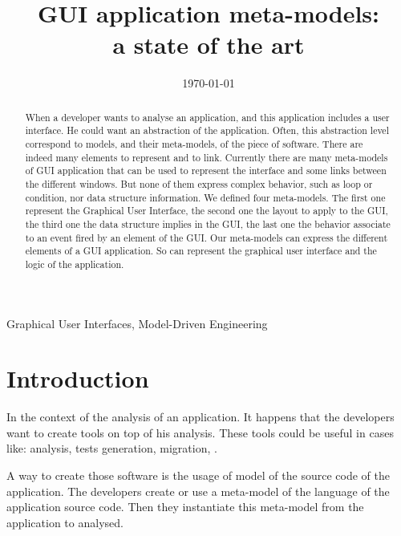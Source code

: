 \documentclass[conference]{IEEEtran}
\author{
    \IEEEauthorblockN{Beno\^{i}t Verhaeghe$^{1,2}$, Anne Etien$^1$,\\ Nicolas Anquetil$^1$, St\'{e}phane Ducasse$^1$}\IEEEauthorblockA{$^1$Universit\'{e} de Lille, CNRS, Inria, \\ Centrale Lille, UMR 9189 -- CRIStAL, France\\}
    \and
    \IEEEauthorblockN{Abderrahmane Seriai$^2$, Laurent Deruelle$^2$,\\ Mustapha Derras$^2$}\IEEEauthorblockA{$^2$Berger-Levrault, France}     
}
\begin{document}
\title{GUI application meta-models:\\ a state of the art}


\date{\today}
\maketitle

\begin{abstract}

When a developer wants to analyse an application,
    and this application includes a user interface.
He could want an abstraction of the application.
Often, this abstraction level correspond to models, and their meta-models, of
    the piece of software.
There are indeed many elements to represent and to link.
Currently there are many meta-models of GUI application
    that can be used to represent the interface
    and some links between the different windows.
But none of them express complex behavior, such as loop or condition,
    nor data structure information.
We defined four meta-models.
The first one represent the Graphical User Interface,
    the second one the layout to apply to the GUI, 
    the third one the data structure implies in the GUI, 
    the last one the behavior associate to an event fired by an element of the GUI. 
Our meta-models can express the different elements of a GUI application.
So can represent the graphical user interface
    and the logic of the application.

   
\end{abstract}

\begin{IEEEkeywords}
    Graphical User Interfaces, Model-Driven Engineering
\end{IEEEkeywords}

\section{Introduction}
\label{sec:intro}

 
In the context of the analysis of an application.
It happens that the developers want to create tools on top of his analysis.
These tools could be useful in cases like:
    analysis, tests generation, migration, \etc.

A way to create those software is the usage of model of the source code of the application.
The developers create or use a meta-model of the language of the application source code.
Then they instantiate this meta-model from the application to analysed.
\end{document}

